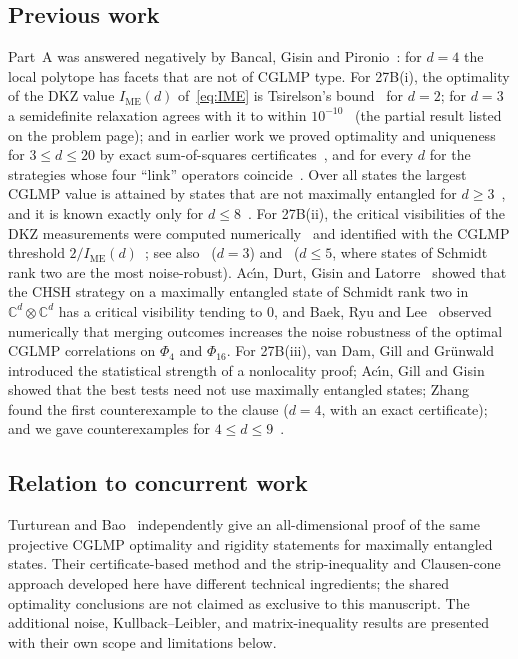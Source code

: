 \documentclass[11pt]{article}
\theoremstyle{remark}
\numberwithin{equation}{section}
\newcommand{\C}{\mathbb{C}}
\newcommand{\IME}{I_{\mathrm{ME}}}
\begin{document}
\subsection{Previous work}
Part~A was answered negatively by Bancal, Gisin and Pironio~\cite{BGP}: for $d=4$ the local polytope has facets that
are not of CGLMP type. For 27B(i), the optimality of the DKZ value $\IME(d)$ of~\eqref{eq:IME} is Tsirelson's
bound~\cite{Tsirelson} for $d=2$; for $d=3$ a semidefinite relaxation agrees with it to within $10^{-10}$~\cite{LVN}
(the partial result listed on the problem page); and in earlier work we proved optimality and uniqueness for
$3\le d\le20$ by exact sum-of-squares certificates~\cite{repoCGLMP}, and for every $d$ for the strategies whose four
``link'' operators coincide~\cite{MSclassical}. Over all states the largest CGLMP value is attained by states that are
not maximally entangled for $d\ge3$~\cite{ADGL}, and it is known exactly only for $d\le8$~\cite{IR,repoCGLMP}. For
27B(ii), the critical visibilities of the DKZ measurements were computed numerically~\cite{KGZMZ,DKZ} and identified
with the CGLMP threshold $2/\IME(d)$~\cite[eq.~(23)]{CGLMP}; see also~\cite{Chen01} ($d=3$) and~\cite{GLZ} ($d\le5$,
where states of Schmidt rank two are the most noise-robust). Ac\'{\i}n, Durt, Gisin and Latorre~\cite[eq.~(14)]{ADGL}
showed that the CHSH strategy on a maximally entangled state of Schmidt rank two in $\C^d\otimes\C^d$ has a critical
visibility tending to $0$, and Baek, Ryu and Lee~\cite{BRL} observed numerically that merging outcomes increases the
noise robustness of the optimal CGLMP correlations on $\Phi_4$ and $\Phi_{16}$. For 27B(iii), van Dam, Gill and
Gr\"unwald~\cite{vDGG} introduced the statistical strength of a nonlocality proof; Ac\'{\i}n, Gill and Gisin~\cite{AGG}
showed that the best tests need not use maximally entangled states; Zhang~\cite{Zhang} found the first counterexample to
the clause ($d=4$, with an exact certificate); and we gave counterexamples for $4\le d\le9$~\cite{repoCGLMP}.

\subsection{Relation to concurrent work}
Turturean and Bao~\cite{TurtureanBao26} independently give an all-dimensional proof of the same
projective CGLMP optimality and rigidity statements for maximally entangled states. Their
certificate-based method and the strip-inequality and Clausen-cone approach developed here have
different technical ingredients; the shared optimality conclusions are not claimed as exclusive
to this manuscript. The additional noise, Kullback--Leibler, and matrix-inequality results are
presented with their own scope and limitations below.
\end{document}
